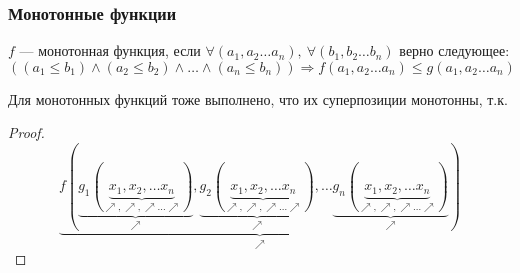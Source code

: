 \subsubsection{Монотонные функции}
\begin{definition}
    $f$ --- монотонная функция, если $\forall(a_1, a_2\dots a_n),\ \forall(b_1, b_2\dots b_n)$ верно следующее: $((a_1 \le b_1) \wedge (a_2 \le b_2) \wedge \dots \wedge (a_n \le b_n)) \Rightarrow f(a_1, a_2 \dots a_n) \le g(a_1, a_2 \dots a_n)$    
\end{definition}

\begin{theorem}
    Для монотонных функций тоже выполнено, что их суперпозиции монотонны, т.к.
\end{theorem}
\begin{proof}
    $$\underbrace{f(\underbrace{g_1(\underbrace{x_1, x_2, \dots x_n}_{\nearrow, \nearrow, \nearrow\dots \nearrow})}_{\nearrow}, \underbrace{g_2(\underbrace{x_1, x_2, \dots x_n}_{\nearrow, \nearrow, \nearrow\dots \nearrow})}_{\nearrow}, \dots \underbrace{g_n(\underbrace{x_1, x_2, \dots x_n}_{\nearrow, \nearrow, \nearrow\dots \nearrow})}_{\nearrow})}_{\nearrow}$$
\end{proof}